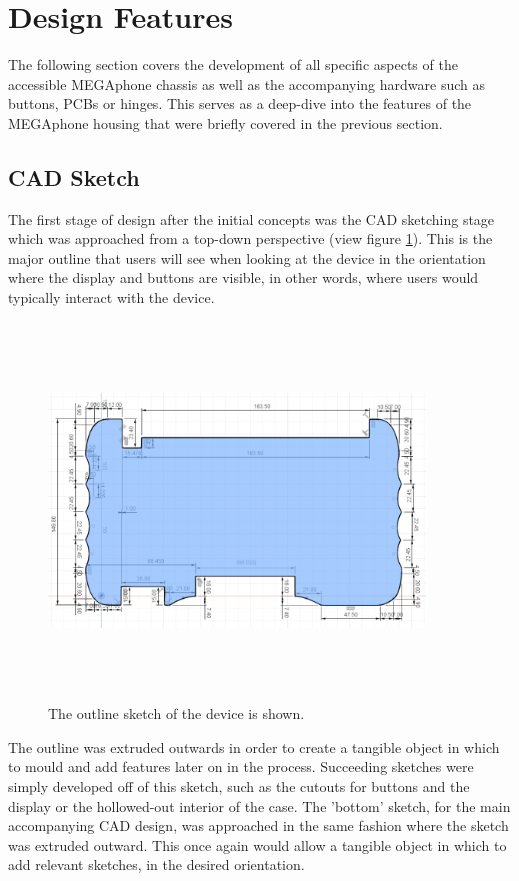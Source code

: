 \section{Design Features} \label{Features}

The following section covers the development of all specific aspects of the accessible MEGAphone chassis as well as the accompanying hardware such as buttons, PCBs or hinges.
This serves as a deep-dive into the features of the MEGAphone housing that were briefly covered in the previous section.

\subsection{CAD Sketch}

The first stage of design after the initial concepts was the CAD sketching stage which was approached from a top-down perspective (view figure \ref{fig:Sketch}).
This is the major outline that users will see when looking at the device in the orientation where the display and buttons are visible, in other words, where users would typically interact with the device.

\begin{figure} [h]
    \centering
    \includegraphics[width=10cm,height=10cm,keepaspectratio]{Figures/blue_sketch.png}
    \caption{The outline sketch of the device is shown.}
    \label{fig:Sketch}
\end{figure}

The outline was extruded outwards in order to create a tangible object in which to mould and add features later on in the process.
Succeeding sketches were simply developed off of this sketch, such as the cutouts for buttons and the display or the hollowed-out interior of the case.
The 'bottom' sketch, for the main accompanying CAD design, was approached in the same fashion where the sketch was extruded outward.
This once again would allow a tangible object in which to add relevant sketches, in the desired orientation.

